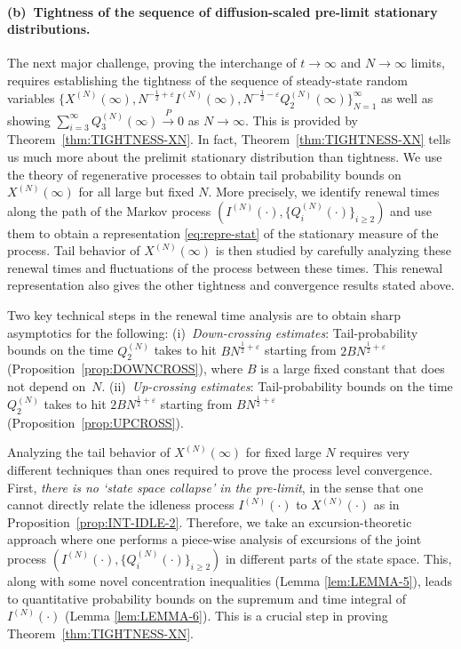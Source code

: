 \documentclass[11pt, reqno]{article}
\numberwithin{equation}{section}
\numberwithin{theorem}{section}
\newcommand\blue[1]{#1}
\begin{document}
\paragraph{(b)~Tightness of the sequence of \blue{diffusion-scaled} pre-limit stationary distributions.}
The next major challenge, proving the interchange of $t\to\infty$ and $N\to\infty$ limits, requires establishing the tightness of the sequence of steady-state random variables $\{X^{(N)}(\infty), N^{-\frac{1}{2} + \varepsilon}I^{(N)}(\infty), N^{-\frac{1}{2} - \varepsilon}Q^{(N)}_2(\infty)\}_{N=1}^\infty$ as well as showing $\sum_{i=3}^{\infty}Q^{(N)}_3(\infty) \xrightarrow{P} 0$ as $N \rightarrow \infty$.
This is provided by Theorem~\ref{thm:TIGHTNESS-XN}.
In fact, Theorem~\ref{thm:TIGHTNESS-XN} tells us much more about the prelimit stationary distribution than tightness.
We use the theory of regenerative processes to obtain tail probability bounds on $X^{(N)}(\infty)$ for all large but fixed $N$. More precisely, we identify renewal times along the path of the Markov process $(I^{(N)}(\cdot), \{Q^{(N)}_i(\cdot)\}_{i \ge 2})$ and use them to obtain a representation \eqref{eq:repre-stat} of the stationary measure of the process. Tail behavior of $X^{(N)}(\infty)$ is then studied by carefully analyzing these renewal times and fluctuations of the process between these times. This renewal representation also gives the other tightness and convergence results stated above.

Two key technical steps in the renewal time analysis are to obtain sharp asymptotics for the following: 
    (i)~\emph{Down-crossing estimates}: Tail-probability bounds on the time $Q_2^{(N)}$ takes to hit $BN^{\frac{1}{2}+\varepsilon}$ starting from $2BN^{\frac{1}{2}+\varepsilon}$ (Proposition~\ref{prop:DOWNCROSS}), where $B$ is a large fixed constant that does not depend on~$N$.
    (ii)~\emph{Up-crossing estimates}:  Tail-probability bounds on the time $Q_2^{(N)}$ takes to hit $2BN^{\frac{1}{2}+\varepsilon}$ starting from $BN^{\frac{1}{2}+\varepsilon}$ (Proposition~\ref{prop:UPCROSS}).

Analyzing the tail behavior of $X^{(N)}(\infty)$ for fixed large $N$ requires very different techniques than ones required to prove the process level convergence. 
First, \emph{there is no `state space collapse' in the pre-limit}, in the sense that one cannot directly relate the idleness process $I^{(N)}(\cdot)$ to $X^{(N)}(\cdot)$ as in Proposition~\ref{prop:INT-IDLE-2}. 
Therefore, we take an excursion-theoretic approach where one performs a piece-wise analysis of excursions of the joint process $(I^{(N)}(\cdot), \{Q^{(N)}_i(\cdot)\}_{i \ge 2})$ in different parts of the state space. This, along with some novel concentration inequalities (Lemma \ref{lem:LEMMA-5}), leads to quantitative probability bounds on the supremum and time integral of $I^{(N)}(\cdot)$ (Lemma \ref{lem:LEMMA-6}). This is a crucial step in proving Theorem~\ref{thm:TIGHTNESS-XN}.
\end{document}
